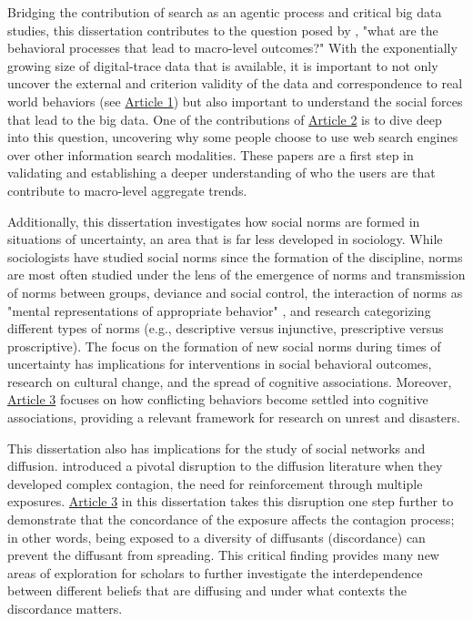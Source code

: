 Bridging the contribution of search as an agentic process and critical big data
studies, this dissertation contributes to the question posed by
\citet{breigerScaling2015}, "what are the behavioral processes that lead to
macro-level outcomes?" With the exponentially growing size of digital-trace data
that is available, it is important to not only uncover the external and
criterion validity of the data and correspondence to real world behaviors (see
\hyperlink{paper-1}{Article 1}) but also important to understand the social
forces that lead to the big data. One of the contributions of
\hyperlink{paper-2}{Article 2} is to dive deep into this question, uncovering
why some people choose to use web search engines over other information search
modalities. These papers are a first step in validating and establishing a
deeper understanding of who the users are that contribute to macro-level
aggregate trends.

Additionally, this dissertation investigates how social norms are formed in
situations of uncertainty, an area that is far less developed in sociology.
While sociologists have studied social norms since the formation of the
discipline, norms are most often studied under the lens of the emergence of
norms and transmission of norms between groups, deviance and social control, the
interaction of norms as "mental representations of appropriate behavior"
\citep{aarts2003silence}, and research categorizing different types of norms
(e.g., descriptive versus injunctive, prescriptive versus proscriptive). The
focus on the formation of new social norms during times of uncertainty has
implications for interventions in social behavioral outcomes, research on
cultural change, and the spread of cognitive associations. Moreover,
\hyperlink{paper-3}{Article 3} focuses on how conflicting behaviors become
settled into cognitive associations, providing a relevant framework for research
on unrest and disasters.

This dissertation also has implications for the study of social networks and
diffusion. \citet{centolaComplexContagionsWeakness2007} introduced a pivotal
disruption to the diffusion literature when they developed complex contagion,
the need for reinforcement through multiple exposures.
\hyperlink{paper-3}{Article 3} in this dissertation takes this disruption one
step further to demonstrate that the concordance of the exposure affects the
contagion process; in other words, being exposed to a diversity of diffusants
(discordance) can prevent the diffusant from spreading. This critical finding
provides many new areas of exploration for scholars to further investigate the
interdependence between different beliefs that are diffusing and under what
contexts the discordance matters.

